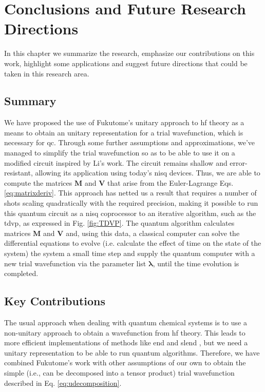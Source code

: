 \documentclass{aux/ttuthes2007}
\begin{document}
\chapter{\textbf{Conclusions and Future Research Directions}}\label{chap:conclusion}

In this chapter we summarize the research, emphasize our contributions on this work, highlight some applications and suggest future directions that could be taken in this research area.

\section{\textbf{Summary}}

We have proposed the use of Fukutome's  unitary approach to \gls{hf} theory as a means to obtain an unitary representation for a trial wavefunction, which is necessary for \gls{qc}.
Through some further assumptions and approximations, we've managed to simplify the trial wavefunction so as to be able to use it on a modified circuit inspired by Li's  work. The circuit remains shallow and error-resistant, allowing its application using today's \gls{nisq} devices.
Thus, we are able to compute the matrices $\bm M$ and $\bm V$ that arise from the Euler-Lagrange Eqs. \ref{eq:matrixderiv}.
This approach has netted us a result that requires a number of shots scaling quadratically with the required precision, making it possible to run this quantum circuit as a \gls{nisq} coprocessor to an iterative algorithm, such as the \gls{tdvp}, as expressed in Fig. \ref{fig:TDVP}.
The quantum algorithm calculates matrices $\bm M$ and $\bm V$ and, using this data, a classical computer can solve the differential equations 
to evolve (i.e. calculate the effect of time on the state of the system) the system a small time step and supply the quantum computer with a new trial wavefunction via the parameter list $\bm \lambda$, until the time evolution is completed.

\section{\textbf{Key Contributions}}

The usual approach when dealing with quantum chemical systems is to use a non-unitary approach to obtain a wavefunction from \gls{hf} theory.
This leads to more efficient implementations of methods like \gls{end} and \gls{slend} , but we need a unitary representation to be able to run quantum algorithms.
Therefore, we have combined Fukutome's  work with other assumptions of our own to obtain the 
simple (i.e., can be decomposed into a tensor product) trial wavefunction described in Eq. \ref{eq:udecomposition}.
\end{document}
